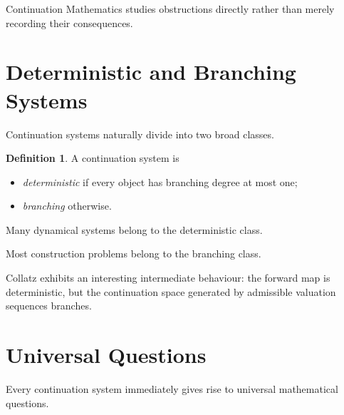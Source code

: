 \documentclass[13pt,openany]{book}
\theoremstyle{plain}
\theoremstyle{definition}
\newtheorem{definition}{Definition}[chapter]
\begin{document}
Continuation Mathematics studies obstructions directly rather than merely
recording their consequences.

\section{Deterministic and Branching Systems}

Continuation systems naturally divide into two broad classes.

\begin{definition}

A continuation system is

\begin{itemize}

\item \emph{deterministic}
if every object has branching degree at most one;

\item \emph{branching}
otherwise.

\end{itemize}

\end{definition}

Many dynamical systems belong to the deterministic class.

Most construction problems belong to the branching class.

Collatz exhibits an interesting intermediate behaviour: the forward map is
deterministic, but the continuation space generated by admissible
valuation sequences branches.

\section{Universal Questions}

Every continuation system immediately gives rise to universal mathematical
questions.
\end{document}
